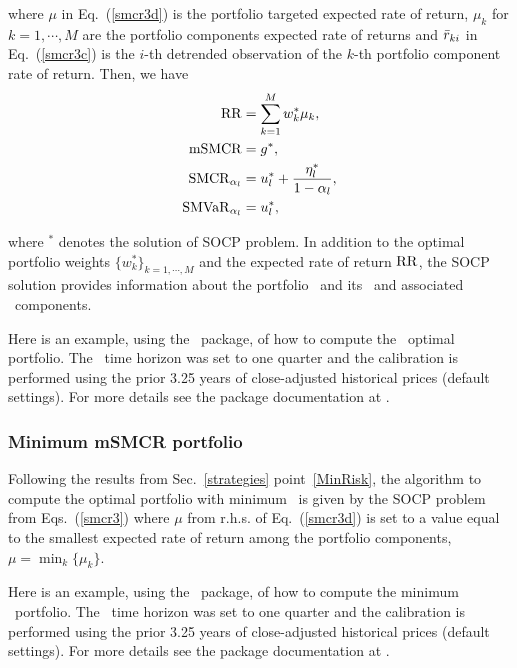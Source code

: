 \noindent where $\mu$ in Eq.~(\ref{smcr3d}) is the portfolio targeted expected rate of return, $\mu_k$ for $k=1,\cdots,M$
are the portfolio components expected rate of returns and ${\bar r}_{ki}$ in Eq.~(\ref{smcr3c}) is the $i$-th detrended observation of the
$k$-th portfolio component rate of return.
Then, we have
\begin{subequations}\label{smcr4}
\begin{align}
    \RR &= \sum_{k=1}^M w_k^* \mu_k, \label{smcr4a} \\
    \mSMCR &= g^*, \label{smcr4b} \\
    \SMCR_{\alpha_l} &= u_l^* + \frac{\eta_l^*}{1-\alpha_l} , \label{smcr4c} \\
    \SMVaR_{\alpha_l} &= u_l^*, \label{smcr4d}
\end{align}
\end{subequations}

\noindent where $^*$ denotes the solution of SOCP problem.
In addition to the optimal portfolio weights $\{w_k^*\}_{k=1,\cdots,M}$ and the expected rate of return ${\rm RR}$,
the SOCP solution provides information about the portfolio \mSMCR\ and its \SMCR\  and
associated \SMVaR\ components.

\bigskip
\noindent Here is an example, using the \azapy\ package, of how to compute the \mSMCR\ optimal portfolio.
The \mSMCR\ time horizon was set to one quarter and the calibration is performed using the prior 3.25 years of
close-adjusted historical prices (default settings).
For more details see the package documentation at \azapydoc.



\BackToContents

\subsubsection{Minimum mSMCR portfolio}
Following the results from Sec.~\ref{strategies} point~\ref{MinRisk},
the algorithm to compute the optimal portfolio with minimum \mSMCR\ is given by the SOCP problem from Eqs.~(\ref{smcr3}) where
$\mu$ from r.h.s. of Eq.~(\ref{smcr3d}) is set to a value equal to the smallest expected rate of
return among the portfolio components, \ie\ $\mu = \min_k\{\mu_k\}$.

\bigskip
\noindent Here is an example, using the \azapy\ package, of how to compute the minimum \mSMCR\ portfolio.
The \mSMCR\ time horizon was set to one quarter and the calibration is performed using the prior 3.25 years of
close-adjusted historical prices (default settings).
For more details see the package documentation at \azapydoc.

